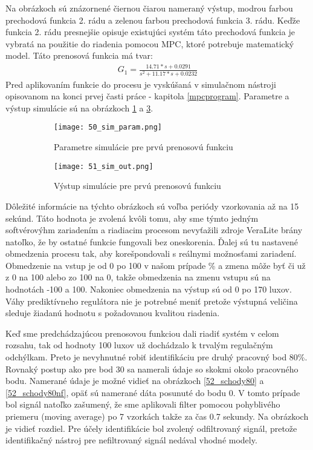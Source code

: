 Na obrázkoch sú znázornené čiernou čiarou nameraný výstup, modrou farbou prechodová funkcia 2. rádu a zelenou farbou prechodová funkcia 3. rádu. Keďže funkcia 2. rádu presnejšie opisuje existujúci systém táto prechodová funkcia je vybratá na použitie do riadenia pomocou MPC, ktoré potrebuje matematický model. Táto prenosová funkcia má tvar:
\begin{equation} \label{eq40}
\begin{split}
 G_1 = \frac{14.71*s + 0.0291}{s^2 + 11.17*s + 0.0232}
\end{split}
\end{equation} 
Pred aplikovaním funkcie do procesu je  vyskúšaná v simulačnom nástroji opisovanom na konci prvej časti práce - kapitola \ref{mpcprogram}. Parametre a výstup simulácie sú na obrázkoch \ref{50_sim_param} a \ref{51_sim_out}.
\begin{figure}[!htbp]
\centering
\begin{subfigure}{0.5\linewidth}
\texttt{[image: 50\_sim\_param.png]}
\caption{Parametre simulácie pre prvú prenosovú funkciu}
\label{50_sim_param}
\end{subfigure}%
\begin{subfigure}{0.5\linewidth}
\texttt{[image: 51\_sim\_out.png]}
\caption{Výstup simulácie pre prvú prenosovú funkciu}
\label{51_sim_out}
\end{subfigure}
\caption{}
\end{figure}
Dôležité informácie na týchto obrázkoch sú voľba periódy vzorkovania až na 15 sekúnd. Táto hodnota je zvolená kvôli tomu, aby sme týmto jedným softvérovýhm zariadením a riadiacim procesom nevyťažili  zdroje VeraLite brány natoľko, že by ostatné funkcie fungovali bez oneskorenia.  Ďalej sú tu nastavené obmedzenia procesu tak, aby korešpondovali s reálnymi možnosťami zariadení. Obmedzenie na vstup je od 0 po 100 v našom prípade \% a zmena môže byť či už z 0 na 100 alebo zo 100 na 0, takže obmedzenia na zmenu vstupu sú na hodnotách -100 a 100. Nakoniec obmedzenia na výstup sú od 0 po 170 luxov. Váhy prediktívneho regulátora nie je potrebné meniť pretože výstupná veličina sleduje žiadanú hodnotu s požadovanou kvalitou riadenia.
 
\indent Keď sme predchádzajúcou prenosovou funkciou dali riadiť systém v celom rozsahu, tak od hodnoty 100 luxov už dochádzalo k trvalým regulačným odchýlkam. Preto je nevyhnutné robiť identifikáciu pre druhý pracovný bod 80\%. Rovnaký postup ako pre bod 30 sa namerali údaje so skokmi okolo pracovného bodu. Namerané údaje je možné vidieť na obrázkoch \ref{52_schody80} a \ref{52_schody80nf}, opäť sú namerané dáta posunuté do bodu 0. V tomto prípade bol signál natoľko zašumený, že sme aplikovali filter pomocou pohyblivého priemeru (moving average) po 7 vzorkách takže za čas 0.7 sekundy. Na obrázkoch je vidieť rozdiel. Pre účely identifikácie bol zvolený odfiltrovaný signál, pretože identifikačný nástroj pre nefiltrovaný signál nedával vhodné modely. 


